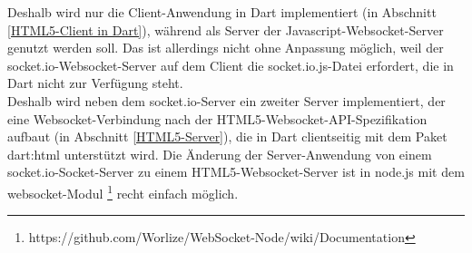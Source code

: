 Deshalb wird nur die Client-Anwendung in Dart implementiert (in Abschnitt \ref{HTML5-Client in Dart}), während als Server der Javascript-Websocket-Server genutzt werden soll. Das ist allerdings nicht ohne Anpassung möglich, weil der socket.io-Websocket-Server auf dem Client die socket.io.js-Datei erfordert, die in Dart nicht zur Verfügung steht. \\Deshalb wird neben dem socket.io-Server ein zweiter Server implementiert, der eine Websocket-Verbindung nach der HTML5-Websocket-API-Spezifikation aufbaut (in Abschnitt \ref{HTML5-Server}), die in Dart clientseitig mit dem Paket dart:html unterstützt wird. Die Änderung der Server-Anwendung von einem socket.io-Socket-Server zu einem HTML5-Websocket-Server ist in node.js mit dem websocket-Modul  \footnote{https://github.com/Worlize/WebSocket-Node/wiki/Documentation} recht einfach möglich.

